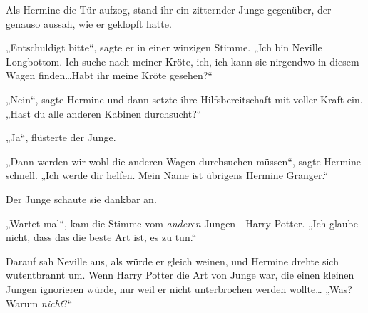 Als Hermine die Tür aufzog, stand ihr ein zitternder Junge gegenüber, der genauso aussah, wie er geklopft hatte.

„Entschuldigt bitte“, sagte er in einer winzigen Stimme. „Ich bin Neville Longbottom. Ich suche nach meiner Kröte, ich, ich kann sie nirgendwo in diesem Wagen finden…Habt ihr meine Kröte gesehen?“

„Nein“, sagte Hermine und dann setzte ihre Hilfsbereitschaft mit voller Kraft ein. „Hast du alle anderen Kabinen durchsucht?“

„Ja“, flüsterte der Junge.

„Dann werden wir wohl die anderen Wagen durchsuchen müssen“, sagte Hermine schnell. „Ich werde dir helfen. Mein Name ist übrigens Hermine Granger.“

Der Junge schaute sie dankbar an.

„Wartet mal“, kam die Stimme vom \emph{anderen} Jungen—Harry Potter. „Ich glaube nicht, dass das die beste Art ist, es zu tun.“

Darauf sah Neville aus, als würde er gleich weinen, und Hermine drehte sich wutentbrannt um. Wenn Harry Potter die Art von Junge war, die einen kleinen Jungen ignorieren würde, nur weil er nicht unterbrochen werden wollte… „Was? Warum \emph{nicht}?“

